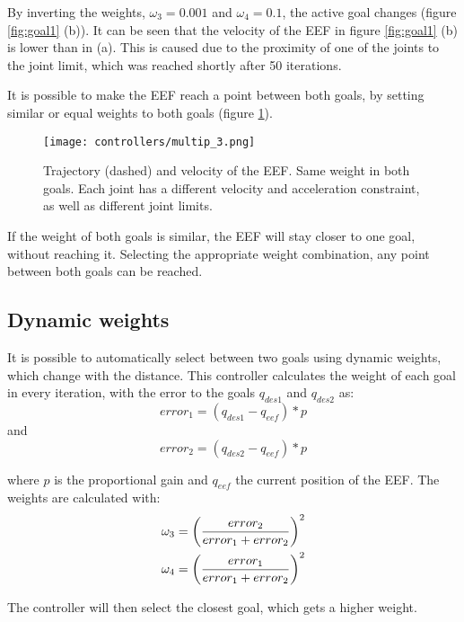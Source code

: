 By inverting the weights, $\omega_{3} = 0.001$ and $\omega_{4} = 0.1$, the active goal changes (figure \ref{fig:goal1} (b)). It can be seen that the velocity of the EEF in figure \ref{fig:goal1} (b) is lower than in (a). This is caused due to the proximity of one of the joints to the joint limit, which was reached shortly after 50 iterations.

It is possible to make the EEF reach a point between both goals, by setting similar or equal weights to both goals (figure \ref{fig:goal2}). 
\begin{figure}[H]
	\centering
	\texttt{[image: controllers/multip\_3.png]}
	\vspace{-10pt}
	\caption[Multiple goals: Middle point]{Trajectory (dashed) and velocity  of the EEF. Same weight in both goals. Each joint has a different velocity and acceleration constraint, as well as different joint limits.}
	\vspace{-15pt}
	\label{fig:goal2}
\end{figure}
If the weight of both goals is similar, the EEF will stay closer to one goal, without reaching it. Selecting the appropriate weight combination, any point between both goals can be reached.


\subsection{Dynamic weights}

It is possible to automatically select between two goals using dynamic weights, which change with the distance. This controller calculates the weight of each goal in every iteration, with the error to the goals $q_{des1}$ and $q_{des2}$ as: 
$$error_1 = (q_{des1} - q_{eef})*p $$
and
$$error_2 = (q_{des2} - q_{eef})*p $$

where $p$ is the proportional gain and $q_{eef}$ the current position of the EEF. The weights are calculated with:
\begin{subequations}
	\begin{align}
		 \omega_3 = \left( \dfrac{error_2}{error_1 + error_2} \right) ^{2} \\
		 \omega_4 = \left( \dfrac{error_1}{error_1 + error_2} \right) ^{2}
	\end{align}
	\label{eq:dyn}
	\vspace{-10pt}
\end{subequations}

The controller will then select the closest goal, which gets a higher weight. 

